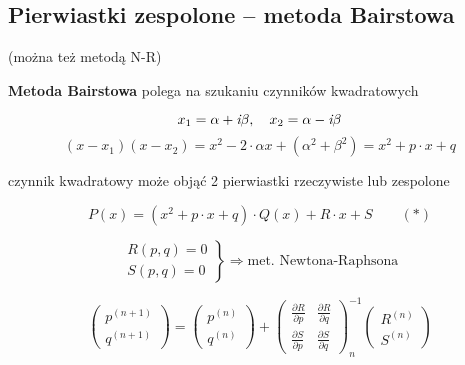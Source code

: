 \subsection{Pierwiastki zespolone -- metoda Bairstowa}

\begin{frame}
  (można też metodą N-R)

  \textbf{Metoda Bairstowa} polega na szukaniu czynników kwadratowych

  $$x_1 = \alpha + \textit{\textrm{i}}\beta, \quad x_2 = \alpha - \textit{\textrm{i}}\beta$$
  $$(x - x_1)(x - x_2) = x^2 - 2 \cdot \alpha x + (\alpha^2 + \beta^2) = x^2 + p \cdot x + q$$

  czynnik kwadratowy może objąć 2 pierwiastki rzeczywiste lub zespolone

  $$P(x) = (x^2 + p \cdot x + q) \cdot Q(x) + R \cdot x + S \qquad (*)$$
\end{frame}

\begin{frame}
  $$\left. \begin{array}{l}
  R(p,q)=0 \\ S(p,q)=0
  \end{array}\right\} \Rightarrow \text{met. Newtona-Raphsona}$$

  $$\left( \begin{array}{l}
  p^{(n+1)} \\ q^{(n+1)}
  \end{array} \right)
  =
  \left( \begin{array}{l}
  p^{(n)} \\ q^{(n)}
  \end{array} \right)
  +
  \left( \begin{array}{ll}
  \frac{{\partial}R}{{\partial}p} & \frac{{\partial}R}{{\partial}q} \\
  \frac{{\partial}S}{{\partial}p} & \frac{{\partial}S}{{\partial}q}
  \end{array} \right)_n^{-1}
  \left( \begin{array}{l}
  R^{(n)} \\ S^{(n)}
  \end{array} \right)$$
\end{frame}

